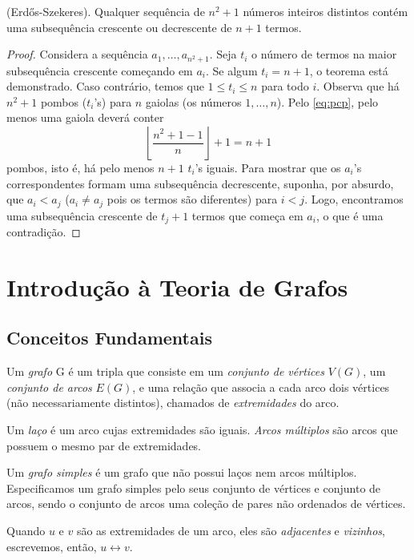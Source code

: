 \documentclass{article}
\begin{document}
\begin{thm} (Erdős-Szekeres).
    Qualquer sequência de \(n^2+1\) números inteiros distintos contém uma subsequência crescente ou decrescente de \(n+1\) termos.
\end{thm}

\begin{proof}
    Considera a sequência \(a_1, \ldots, a_{n^2+1}\). Seja \(t_i\) o número de termos na maior subsequência crescente começando em \(a_i\). Se algum \(t_i=n+1\), o teorema está demonstrado. 
    Caso contrário, temos que \(1\leq t_i \leq n\) para todo \(i\). Observa que há \(n^2+1\) pombos (\(t_i\)'s) para \(n\) gaiolas (os números \(1, \ldots, n\)). Pelo \eqref{eq:pcp}, pelo menos uma gaiola deverá conter
    \begin{equation*}
        \left \lfloor \frac{n^2+1-1}{n} \right \rfloor + 1 = n+1
    \end{equation*}
    \noindent pombos, isto é, há pelo menos \(n+1\) \(t_i\)'s iguais. Para mostrar que os \(a_i\)'s correspondentes formam uma subsequência decrescente, suponha, por absurdo, que \(a_i < a_j\) (\(a_i \neq a_j\) pois os termos são diferentes) para \(i < j\).
    Logo, encontramos uma subsequência crescente de \(t_{j}+1\) termos que começa em \(a_i\), o que é uma contradição.
\end{proof}

\section{Introdução à Teoria de Grafos}

\subsection{Conceitos Fundamentais}

\begin{defn}
    Um \emph{grafo} G é um tripla que consiste em um \emph{conjunto de vértices} \(V(G)\), um \emph{conjunto de arcos} \(E(G)\), e uma relação que associa a cada arco dois vértices (não necessariamente distintos), chamados de \emph{extremidades} do arco.
\end{defn}

\begin{defn}
    Um \emph{laço} é um arco cujas extremidades são iguais. \emph{Arcos múltiplos} são arcos que possuem o mesmo par de extremidades. 
    
    Um \emph{grafo simples} é um grafo que não possui laços nem arcos múltiplos. Especificamos um grafo simples pelo seus conjunto de vértices e conjunto de arcos, sendo o conjunto de arcos uma coleção de pares não ordenados de vértices. 
    
    Quando \(u\) e \(v\) são as extremidades de um arco, eles são \emph{adjacentes} e \emph{vizinhos}, escrevemos, então, \(u \leftrightarrow v\).
\end{defn}
\end{document}
